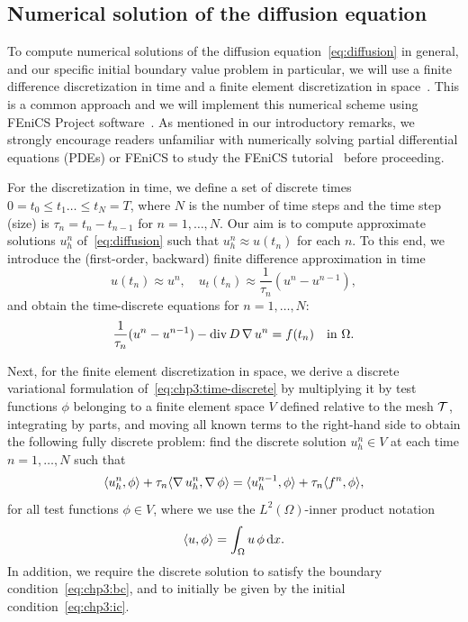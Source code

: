 \subsection{Numerical solution of the diffusion equation}
\label{sec:chp3:model-problem-numerical-formulation}

%
%
To compute numerical solutions of the diffusion
equation~\eqref{eq:diffusion} in general, and our specific initial
boundary value problem in particular, we will use a finite difference
discretization in time and a finite element discretization in
space~\cite{langtangen2019introduction,
  gockenbach2006understanding}. This is a common approach and we will
implement this numerical scheme using FEniCS Project
software~\cite{logg2012automated,alnaes2015fenics,langtangen2016solving}. As
mentioned in our introductory remarks, we strongly encourage readers
unfamiliar with numerically solving partial differential equations
(PDEs) or FEniCS to study the FEniCS
tutorial~\cite{langtangen2016solving} before proceeding.

For the discretization in time, we define a set of discrete times $0 =
t_0 \leq t_1 \dots \leq t_N = T$, where $N$ is the number of time
steps and the time step (size) is $\tau_n = t_n - t_{n-1}$ for $n = 1,
\dots, N$. Our aim is to compute approximate solutions $u^n_h$
of~\eqref{eq:diffusion} such that $u^n_h \approx u(t_n)$ for each
$n$. To this end, we introduce the (first-order, backward) finite
difference approximation in time
\begin{equation}
  u(t_n) \approx u^n, \quad
  u_t(t_n) \approx \frac{1}{\tau_n} (u^n - u^{n-1}),
\end{equation}
and obtain the time-discrete equations for $n = 1, \dots, N$:
\begin{equation}
  \label{eq:chp3:time-discrete}
  \frac{1}{\tau_n} (u^n - u^{n-1}) - \operatorname{\mathrm{div}} D \operatorname{\nabla} u^n = f(t_n) \quad \text{in } \Omega. 
\end{equation}

Next, for the finite element discretization in space, we derive a
discrete variational formulation of~\eqref{eq:chp3:time-discrete} by
multiplying it by test functions $\phi$ belonging to a finite element space $V$
defined relative to the mesh $\mathcal{T}$, integrating by parts, and moving
all known terms to the right-hand side to obtain the following fully
discrete problem: find the discrete solution $u_h^n \in V$ at each
time $n = 1, \dots, N$ such that
\begin{equation}
  \label{eq:chp3:discrete}
  \langle u_h^n,\phi\rangle + \tau_n \langle \operatorname{\nabla} u_h^n,\operatorname{\nabla} \phi\rangle
  =  \langle u_h^{n-1},\phi\rangle + \tau_n \langle f^n,\phi\rangle,  
\end{equation}
for all test functions $\phi \in V$, where we use the
$L^2(\Omega)$-inner product notation
\begin{equation}
  \langle u,\phi\rangle = \int_{\Omega} u \, \phi \, \mathrm{d}x.
\end{equation}
In addition, we require the discrete solution to satisfy the
boundary condition~\eqref{eq:chp3:bc}, and to initially be given by the
initial condition~\eqref{eq:chp3:ic}.  

